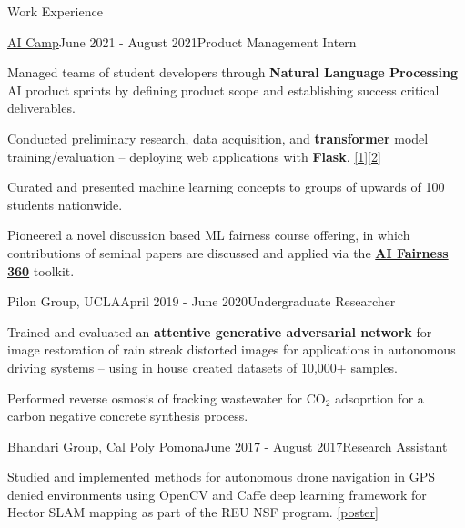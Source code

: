 \documentclass{resume}
\begin{document}
\begin{rSection}{Work Experience}
    \begin{rSubsection}{\href{https://www.ai-camp.org/}{AI Camp}}{June 2021 - August 2021}{Product Management Intern}
        \item Managed teams of student developers through \textbf{Natural Language Processing} AI product sprints by defining product scope and establishing success critical deliverables.
        \item Conducted preliminary research, data acquisition, and \textbf{transformer} model training/evaluation – deploying web applications with \textbf{Flask}. 
            \href{https://haiku-generator.ai-camp.org/}{[1]}\href{https://sentiment-text-generator.ai-camp.org/}{[2]}
        \item Curated and presented machine learning concepts to groups of upwards of 100 students nationwide.
        \item Pioneered a novel discussion based ML fairness course offering, in which contributions of seminal papers are discussed and applied via the \href{https://github.com/Trusted-AI/AIF360}{\bf AI Fairness 360} toolkit.
    \end{rSubsection}
    \begin{rSubsection}{Pilon Group, UCLA}{April 2019 - June 2020}{Undergraduate Researcher}
        \item Trained and evaluated an \textbf{attentive generative adversarial network} for image restoration of rain streak distorted
        images for applications in autonomous driving systems – using in house created datasets of 10,000+ samples.
        \item Performed reverse osmosis of fracking wastewater for $\text{CO}_2$ adsoprtion for a carbon negative concrete synthesis process.
    \end{rSubsection}
    \begin{rSubsection}{\small Bhandari Group, Cal Poly Pomona}{June 2017 - August 2017}{Research Assistant}
        \item Studied and implemented methods for autonomous drone navigation in GPS denied environments using OpenCV and Caffe deep learning framework for Hector SLAM mapping as part of the REU NSF program.
        \href{https://docs.google.com/presentation/d/1fp-MPZUgKS_PhMD90d4aL0Rh0-YfghnEYHb3sHKmnGE/edit?usp=sharing}{[poster]}
    \end{rSubsection}
\end{rSection}
\end{document}
